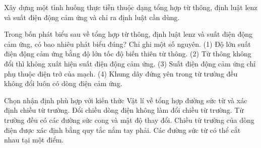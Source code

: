 \begin{bt}
Xây dựng một tình huống thực tiễn thuộc dạng tổng hợp từ thông, định luật lenz và suất điện động cảm ứng và chỉ ra định luật cần dùng.
\end{bt}

\begin{ex}
Trong bốn phát biểu sau về tổng hợp từ thông, định luật lenz và suất điện động cảm ứng, có bao nhiêu phát biểu đúng? Chỉ ghi một số nguyên. (1) Độ lớn suất điện động cảm ứng bằng độ lớn tốc độ biến thiên từ thông. (2) Từ thông không đổi thì không xuất hiện suất điện động cảm ứng. (3) Suất điện động cảm ứng chỉ phụ thuộc điện trở của mạch. (4) Khung dây đứng yên trong từ trường đều không đổi luôn có dòng điện cảm ứng.
\end{ex}

\begin{ex}
Chọn nhận định phù hợp với kiến thức Vật lí về tổng hợp đường sức từ và xác định chiều từ trường.
\choice
{Đổi chiều dòng điện không làm đổi chiều từ trường.}
{Từ trường đều có các đường sức cong và mật độ thay đổi.}
{\True Chiều từ trường của dòng điện được xác định bằng quy tắc nắm tay phải.}
{Các đường sức từ có thể cắt nhau tại một điểm.}
\end{ex}

